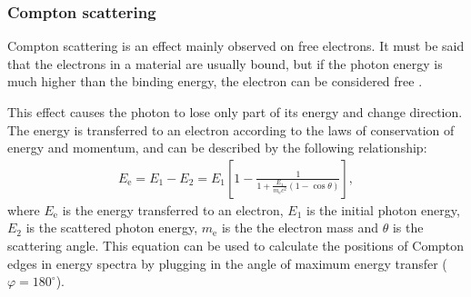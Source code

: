 \subsubsection{Compton scattering}
Compton scattering is an effect mainly observed on free electrons. It must be said that the electrons in a material are usually bound, but if the photon energy is much higher than the binding energy, the electron can be considered free \cite{Leo1987-wy}.
\par
This effect causes the photon to lose only part of its energy and change direction. The energy is transferred to an electron according to the laws of conservation of energy and momentum, and can be described by the following relationship:
\begin{equation}
\begin{aligned}
E_{\textrm{e}} = E_1 - E_2 = E_1 [1- \frac{1}{1+\frac{E_1}{m_{\textrm{e}}c^2}(1 - \cos{\theta})}],
\end{aligned}
\label{compton}
\end{equation}
where $E_{\textrm{e}}$ is the energy transferred to an electron, $E_1$ is the initial photon energy, $E_2$ is the scattered photon energy, $m_{\textrm{e}}$ is the the electron mass and $\theta$ is the scattering angle. This equation can be used to calculate the positions of Compton edges in energy spectra by plugging in the angle of maximum energy transfer ($\varphi = 180^\circ$).


